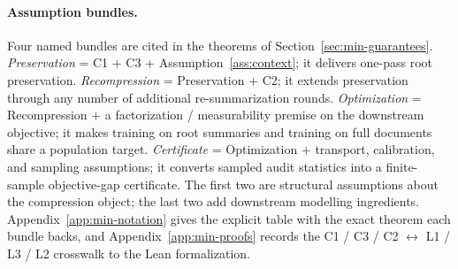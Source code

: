 \paragraph{Assumption bundles.}
Four named bundles are cited in the theorems of
Section~\ref{sec:min-guarantees}.
\emph{Preservation} = C1 + C3 + Assumption~\ref{ass:context}; it delivers
one-pass root preservation. \emph{Recompression} = Preservation + C2; it
extends preservation through any number of additional re-summarization
rounds. \emph{Optimization} = Recompression + a factorization /
measurability premise on the downstream objective; it makes training on
root summaries and training on full documents share a population target.
\emph{Certificate} = Optimization + transport, calibration, and sampling
assumptions; it converts sampled audit statistics into a finite-sample
objective-gap certificate. The first two are structural assumptions about
the compression object; the last two add downstream modelling ingredients.
Appendix~\ref{app:min-notation} gives the explicit table with the exact
theorem each bundle backs, and Appendix~\ref{app:min-proofs} records the
C1 / C3 / C2 $\leftrightarrow$ L1 / L3 / L2 crosswalk to the Lean
formalization.
